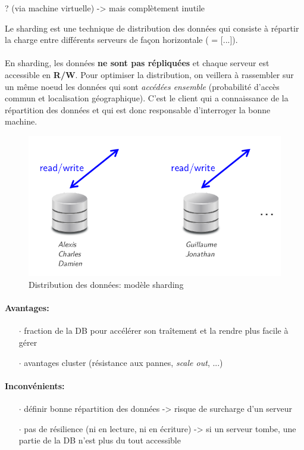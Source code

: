 \item{}
{\vrai ? (via machine virtuelle) -> mais complètement inutile}
{Le sharding est une technique de distribution des données qui consiste à répartir la charge entre différents serveurs de façon horizontale ( = [...]).
\paragraph{}
En sharding, les données \textbf{ne sont pas répliquées} et chaque serveur est accessible en \textbf{R/W}. Pour optimiser la distribution, on veillera à rassembler sur un même noeud les données qui sont \textit{accédées ensemble} (probabilité d'accès commun et localisation géographique). C'est le client qui a connaissance de la répartition des données et qui est donc responsable d'interroger la bonne machine.
\begin{figure}[!h]
\center\includegraphics[scale=.3]{images/sharding}
\caption{Distribution des données: modèle sharding \cite{ref1}}
\end{figure}

\paragraph{Avantages:}
\begin{itemize}
\item[$\cdot$]fraction de la DB pour accélérer son traîtement et la rendre plus facile à gérer
\item[$\cdot$]avantages cluster (résistance aux pannes, \textit{scale out}, ...)
\end{itemize}

\paragraph{Inconvénients:}
\begin{itemize}
\item[$\cdot$]définir bonne répartition des données -> risque de surcharge d'un serveur
\item[$\cdot$]pas de résilience (ni en lecture, ni en écriture) -> si un serveur tombe, une partie de la DB n'est plus du tout accessible
\end{itemize}

}


